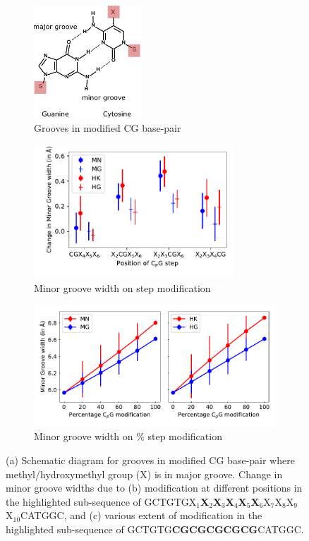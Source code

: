 \begin{figure}[H]
\begin{center}
  \begin{subfigure}{5.25cm}
    \centering\includegraphics[width=4cm]{images/base-pair_mod.pdf}
    \caption{Grooves in modified CG base-pair}
  \end{subfigure}
  \begin{subfigure}{8.5cm}
    \centering\includegraphics[width=7.5cm,trim=0.1cm 0.8cm 0cm 0.5cm]{images/modification_position_effect_minor_groove.pdf}
    \caption{Minor groove width on \cpg step modification}
  \end{subfigure}
  \begin{subfigure}{12cm}
    \centering\includegraphics[width=10cm,trim=0.1cm 0.7cm 0cm 0.1cm]{images/modification_percent_effect_minor_groove.pdf}
    \centering\caption{Minor groove width on \% \cpg step modification}
  \end{subfigure}
\end{center}
\caption{
(a) Schematic diagram for grooves in modified CG base-pair where methyl/hydroxymethyl group (X) is in major groove.
Change in minor groove widths due to (b) \cpg modification at different positions in the highlighted sub-sequence of \linebreak GCTGTGX$_1$\textbf{X$_2$X$_3$}\textbf{X$_4$}\textbf{X$_5$X$_6$}X$_7$X$_8$X$_9$X$_{10}$CATGGC, and
(c) various extent of \cpg modification in the highlighted sub-sequence of GCTGTG\textbf{CG}\textbf{CG}\textbf{CG}\textbf{CG}\textbf{CG}CATGGC.
}
\label{c6:fig7_minor_groove}
\end{figure}

